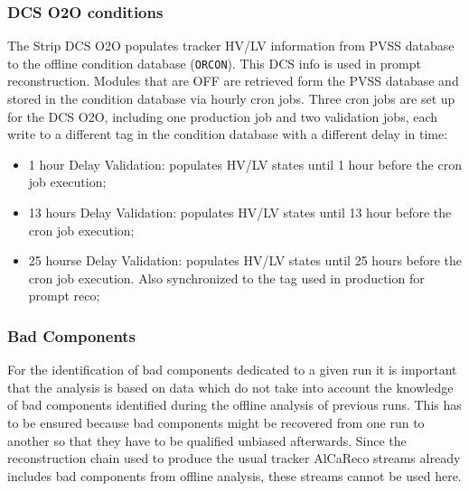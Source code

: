 \subsubsection{DCS O2O conditions}
 The Strip DCS O2O populates tracker HV/LV information from PVSS database to the offline condition database (\texttt{ORCON}). This DCS info is used in prompt reconstruction. Modules that are OFF are retrieved form the PVSS database and stored in the condition database via hourly cron jobs. Three cron jobs are set up for the DCS O2O, including one production job and two validation jobs, each write to a different tag in the condition database with a different delay in time: 
\begin{itemize}
\item 1 hour Delay Validation: populates HV/LV states until 1 hour before the cron job execution;
\item 13 hours Delay Validation: populates HV/LV states until 13 hour before the cron job execution;
\item 25 hourse Delay Validation: populates HV/LV states until 25 hours before the cron job execution. Also synchronized to the tag used in production for prompt reco;
\end{itemize}

\subsubsection{Bad Components}

For the identification of bad components dedicated to a given run it is important that the analysis is based on data which do not take into account the knowledge of bad components identified during the offline analysis of previous runs. This has to be ensured because bad components might be recovered from one run to another so that they have to be qualified unbiased afterwards. Since the reconstruction chain used to produce the usual tracker AlCaReco streams already includes bad components from offline analysis, these streams cannot be used here.

